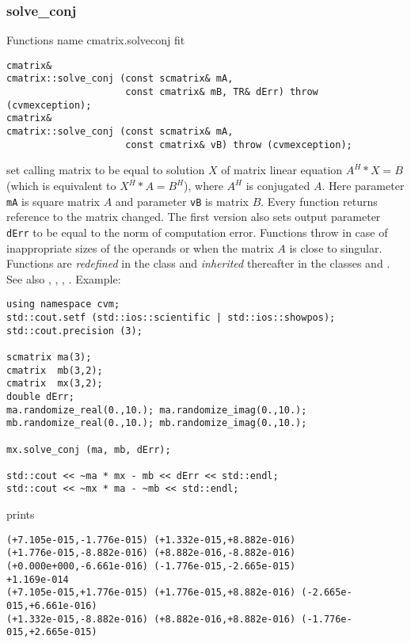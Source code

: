 \subsubsection{solve\_conj}
Functions%
\pdfdest name {cmatrix.solveconj} fit
\begin{verbatim}
cmatrix&
cmatrix::solve_conj (const scmatrix& mA,
                     const cmatrix& mB, TR& dErr) throw (cvmexception);
cmatrix&
cmatrix::solve_conj (const scmatrix& mA,
                     const cmatrix& vB) throw (cvmexception);
\end{verbatim}
set calling matrix to be equal to  solution $X$ of 
matrix linear equation
$A^H*X=B$ (which is equivalent to $X^H*A=B^H$), where $A^H$ is conjugated $A$.
Here parameter \verb"mA" is square matrix $A$
and parameter \verb"vB" is matrix $B$.
Every function returns  reference to the matrix changed.
The first version also sets  output parameter \verb"dErr" to be equal
to the norm of computation error.
Functions throw 
in case of inappropriate sizes
of the operands or when the matrix $A$ is close to singular.
Functions are \emph{redefined} in  the class
 and
\emph{inherited} thereafter in the classes
 and
.
See also
,
,
,
.
Example:
\begin{Verbatim}
using namespace cvm;
std::cout.setf (std::ios::scientific | std::ios::showpos); 
std::cout.precision (3);

scmatrix ma(3);
cmatrix  mb(3,2);
cmatrix  mx(3,2);
double dErr;
ma.randomize_real(0.,10.); ma.randomize_imag(0.,10.);
mb.randomize_real(0.,10.); mb.randomize_imag(0.,10.);

mx.solve_conj (ma, mb, dErr);

std::cout << ~ma * mx - mb << dErr << std::endl;
std::cout << ~mx * ma - ~mb << std::endl;
\end{Verbatim}
prints
\begin{Verbatim}
(+7.105e-015,-1.776e-015) (+1.332e-015,+8.882e-016)
(+1.776e-015,-8.882e-016) (+8.882e-016,-8.882e-016)
(+0.000e+000,-6.661e-016) (-1.776e-015,-2.665e-015)
+1.169e-014
(+7.105e-015,+1.776e-015) (+1.776e-015,+8.882e-016) (-2.665e-015,+6.661e-016)
(+1.332e-015,-8.882e-016) (+8.882e-016,+8.882e-016) (-1.776e-015,+2.665e-015)
\end{Verbatim}
\newpage







